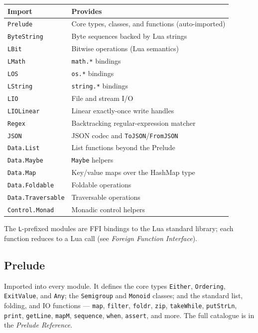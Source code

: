 \documentclass[11pt,a4paper]{article}
\begin{document}
\begin{tabular}{@{}ll@{}}
\toprule
\textbf{Import} & \textbf{Provides} \\
\midrule
\texttt{Prelude}          & Core types, classes, and functions (auto-imported) \\
\texttt{ByteString}       & Byte sequences backed by Lua strings \\
\texttt{LBit}             & Bitwise operations (Lua semantics) \\
\texttt{LMath}            & \texttt{math.*} bindings \\
\texttt{LOS}              & \texttt{os.*} bindings \\
\texttt{LString}          & \texttt{string.*} bindings \\
\texttt{LIO}              & File and stream I/O \\
\texttt{LIOLinear}        & Linear exactly-once write handles \\
\texttt{Regex}            & Backtracking regular-expression matcher \\
\texttt{JSON}             & JSON codec and \texttt{ToJSON}/\texttt{FromJSON} \\
\texttt{Data.List}        & List functions beyond the Prelude \\
\texttt{Data.Maybe}       & \texttt{Maybe} helpers \\
\texttt{Data.Map}         & Key/value maps over the HashMap type \\
\texttt{Data.Foldable}    & Foldable operations \\
\texttt{Data.Traversable} & Traversable operations \\
\texttt{Control.Monad}    & Monadic control helpers \\
\bottomrule
\end{tabular}

The \texttt{L}-prefixed modules are FFI bindings to the Lua standard
library; each function reduces to a Lua call (see \emph{Foreign
Function Interface}).

\subsection{Prelude}

Imported into every module. It defines the core types \texttt{Either},
\texttt{Ordering}, \texttt{ExitValue}, and \texttt{Any}; the
\texttt{Semigroup} and \texttt{Monoid} classes; and the standard list,
folding, and IO functions --- \texttt{map}, \texttt{filter},
\texttt{foldr}, \texttt{zip}, \texttt{takeWhile}, \texttt{putStrLn},
\texttt{print}, \texttt{getLine}, \texttt{mapM}, \texttt{sequence},
\texttt{when}, \texttt{assert}, and more. The full catalogue is in the
\emph{Prelude Reference}.
\end{document}
